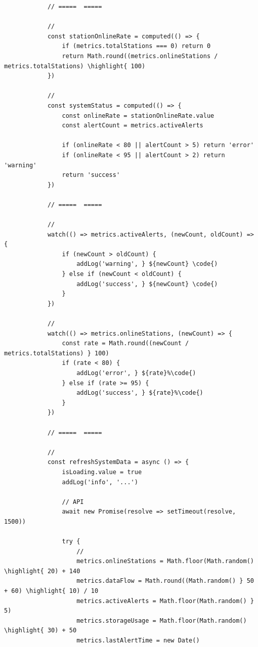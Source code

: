 \begin{verbatim}
            // =====  =====
            
            // 
            const stationOnlineRate = computed(() => {
                if (metrics.totalStations === 0) return 0
                return Math.round((metrics.onlineStations / metrics.totalStations) \highlight{ 100)
            })
            
            // 
            const systemStatus = computed(() => {
                const onlineRate = stationOnlineRate.value
                const alertCount = metrics.activeAlerts
                
                if (onlineRate < 80 || alertCount > 5) return 'error'
                if (onlineRate < 95 || alertCount > 2) return 'warning'
                return 'success'
            })
            
            // =====  =====
            
            // 
            watch(() => metrics.activeAlerts, (newCount, oldCount) => {
                if (newCount > oldCount) {
                    addLog('warning', } ${newCount} \code{)
                } else if (newCount < oldCount) {
                    addLog('success', } ${newCount} \code{)
                }
            })
            
            // 
            watch(() => metrics.onlineStations, (newCount) => {
                const rate = Math.round((newCount / metrics.totalStations) } 100)
                if (rate < 80) {
                    addLog('error', } ${rate}%\code{)
                } else if (rate >= 95) {
                    addLog('success', } ${rate}%\code{)
                }
            })
            
            // =====  =====
            
            // 
            const refreshSystemData = async () => {
                isLoading.value = true
                addLog('info', '...')
                
                // API
                await new Promise(resolve => setTimeout(resolve, 1500))
                
                try {
                    // 
                    metrics.onlineStations = Math.floor(Math.random() \highlight{ 20) + 140
                    metrics.dataFlow = Math.round((Math.random() } 50 + 60) \highlight{ 10) / 10
                    metrics.activeAlerts = Math.floor(Math.random() } 5)
                    metrics.storageUsage = Math.floor(Math.random() \highlight{ 30) + 50
                    metrics.lastAlertTime = new Date()
                    

\end{verbatim}
